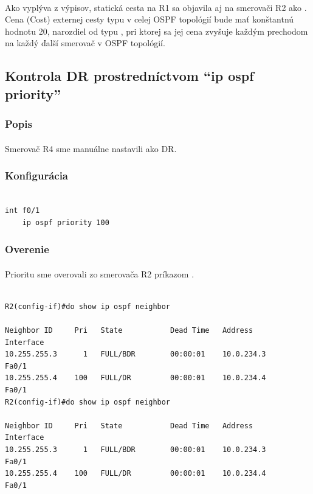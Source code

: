 \documentclass[12pt,twoside,a4paper]{report}
\begin{document}
\paragraph{}
Ako vyplýva z výpisov, statická cesta na R1 sa objavila aj na smerovači R2 ako . Cena (Cost) externej cesty typu  v celej OSPF topológií bude mať konštantnú hodnotu 20, narozdiel od typu , pri ktorej sa jej cena zvyšuje každým prechodom na každý ďalší smerovač v OSPF topológií.



\subsection{Kontrola DR prostredníctvom  “ip ospf priority”}
\subsubsection{Popis}
\paragraph{}
Smerovač R4 sme manuálne nastavili ako DR.

\subsubsection{Konfigurácia}
\noindent
{\selectfont
\begin{small}
\begin{verbatim}

int f0/1
    ip ospf priority 100

\end{verbatim}
\end{small}
}

\subsubsection{Overenie}
\paragraph{}
Prioritu sme overovali zo smerovača R2 príkazom .

\noindent
{\selectfont
\begin{small}
\begin{verbatim}

R2(config-if)#do show ip ospf neighbor

Neighbor ID     Pri   State           Dead Time   Address         Interface
10.255.255.3      1   FULL/BDR        00:00:01    10.0.234.3      Fa0/1
10.255.255.4    100   FULL/DR         00:00:01    10.0.234.4      Fa0/1
R2(config-if)#do show ip ospf neighbor

Neighbor ID     Pri   State           Dead Time   Address         Interface
10.255.255.3      1   FULL/BDR        00:00:01    10.0.234.3      Fa0/1
10.255.255.4    100   FULL/DR         00:00:01    10.0.234.4      Fa0/1

\end{verbatim}
\end{small}
}
\end{document}
